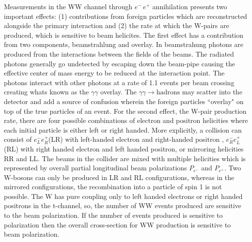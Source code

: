   
   






  
  Measurements in the WW channel through  $e^- \, e^+$ annihilation presents two important effects: (1) contributions from foreign particles which are reconstructed alongside the primary interaction and (2) the rate at which the W-pairs are produced, which is sensitive to beam helicites. The first effect has a contribution from two components, beamstrahlung and overlay. In beamstrahung photons are produced from the interactions between the fields of the beams. The radiated photons generally go undetected by escaping down the beam-pipe causing the effective center of mass energy to be reduced at the interaction point. The photons interact with other photons at a rate of 1.1 events per beam crossing \cite{ILDIDR} creating whats known as the $\gamma \gamma$ overlay. The $\gamma \gamma \rightarrow \text{hadrons}$ may scatter into the detector and add a source of confusion wherein the foreign particles ``overlay" on top of the true particles of an event. For the second effect, the W-pair production rate, there are four possible combinations of electron and positron helicities where each initial particle is either left or right handed. More explicitly, a collision can consist of  $e^-_L e^+_R$(LR) with left-handed electron and right-handed positron , $e^-_R e^+_L$(RL)  with right handed electron and left handed positron, or mirroring helicities RR and LL.  The beams in the collider are mixed with multiple helicities which is represented by overall partial longitudinal beam polarizations $P_{e^-}$ and $ P_{e^+}$.  Two W-bosons can only be produced in LR and RL configurations, whereas in the mirrored configurations, the recombination into a particle of spin 1 is  not possible.  The W has pure coupling only to left handed electrons or right handed positrons in the t-channel, so, the number of  WW events produced are sensitive to the beam polarization\cite{thomson}.  If the number of events produced is sensitive to polarization then the overall cross-section for WW production is sensitive to beam polarization. 











